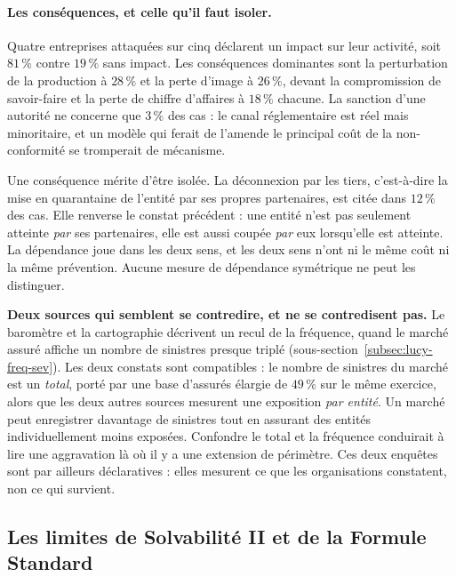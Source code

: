 \paragraph{Les conséquences, et celle qu'il faut isoler.} Quatre entreprises attaquées sur cinq
déclarent un impact sur leur activité, soit $81\,\%$ contre $19\,\%$ sans impact. Les
conséquences dominantes sont la perturbation de la production à $28\,\%$ et la perte d'image à
$26\,\%$, devant la compromission de savoir-faire et la perte de chiffre d'affaires à $18\,\%$
chacune. La sanction d'une autorité ne concerne que $3\,\%$ des cas : le canal réglementaire est
réel mais minoritaire, et un modèle qui ferait de l'amende le principal coût de la non-conformité
se tromperait de mécanisme.

Une conséquence mérite d'être isolée. La déconnexion par les tiers, c'est-à-dire la mise en
quarantaine de l'entité par ses propres partenaires, est citée dans $12\,\%$ des cas. Elle
renverse le constat précédent : une entité n'est pas seulement atteinte \emph{par} ses
partenaires, elle est aussi coupée \emph{par} eux lorsqu'elle est atteinte. La dépendance joue
dans les deux sens, et les deux sens n'ont ni le même coût ni la même prévention. Aucune mesure
de dépendance symétrique ne peut les distinguer.

\begin{attention}
\textbf{Deux sources qui semblent se contredire, et ne se contredisent pas.} Le baromètre et la
cartographie décrivent un recul de la fréquence, quand le marché assuré affiche un nombre de
sinistres presque triplé (sous-section~\ref{subsec:lucy-freq-sev}). Les deux constats sont
compatibles : le nombre de sinistres du marché est un \emph{total}, porté par une base d'assurés
élargie de $49\,\%$ sur le même exercice, alors que les deux autres sources mesurent une
exposition \emph{par entité}. Un marché peut enregistrer davantage de sinistres tout en assurant
des entités individuellement moins exposées. Confondre le total et la fréquence conduirait à lire
une aggravation là où il y a une extension de périmètre. Ces deux enquêtes sont par ailleurs
déclaratives : elles mesurent ce que les organisations constatent, non ce qui survient.
\end{attention}

\subsection{Les limites de Solvabilité II et de la Formule Standard}
\label{subsec:limites-formule-standard}

